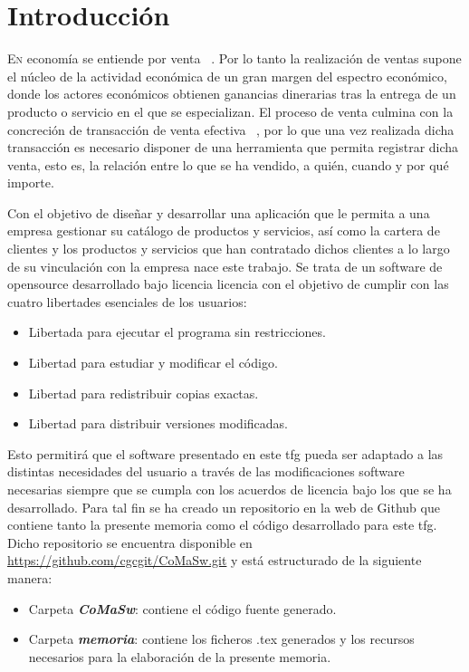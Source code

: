 \chapter{Introducción}
\label{chap:introducion}


\lettrine{E}{n} economía se entiende por venta ~\cite{ventas}. Por lo tanto la realización de ventas supone el núcleo de la actividad económica de un gran margen del espectro económico, donde los actores económicos obtienen ganancias dinerarias tras la entrega de un producto o servicio en el que se especializan. El proceso de venta culmina con la concreción de transacción de venta efectiva ~\cite{proceso-venta}, por lo que una vez realizada dicha transacción es necesario disponer de una herramienta que permita registrar dicha venta, esto es, la relación entre lo que se ha vendido, a quién, cuando y por qué importe.

Con el objetivo de diseñar y desarrollar una aplicación que le permita a una empresa gestionar su catálogo de productos y servicios, así como la cartera de clientes y los productos y servicios que han contratado dichos clientes a lo largo de su vinculación con la empresa nace este trabajo. Se trata de un software de \gls{opensource} desarrollado bajo licencia \acrfull{licencia} con el objetivo de cumplir con las cuatro libertades esenciales de los usuarios:
\begin{itemize}
\item Libertada para ejecutar el programa sin restricciones.
\item Libertad para estudiar y modificar el código.
\item Libertad para redistribuir copias exactas.
\item Libertad para distribuir versiones modificadas.
\end{itemize}

Esto permitirá que el software presentado en este \acrfull{tfg} pueda ser adaptado a las distintas necesidades del usuario a través de las modificaciones software necesarias siempre que se cumpla con los acuerdos de licencia bajo los que se ha desarrollado. Para tal fin se ha creado un repositorio en la web de Github que contiene tanto la presente memoria como el código desarrollado para este \acrshort{tfg}. Dicho repositorio se encuentra disponible en \url{https://github.com/cgcgit/CoMaSw.git} y está estructurado de la siguiente manera:
\begin{itemize}
\item Carpeta \emph{\textbf{CoMaSw}}: contiene el código fuente generado.
\item Carpeta \emph{\textbf{memoria}}: contiene los ficheros .tex generados y los recursos necesarios para la elaboración de la presente memoria.
\end{itemize}

